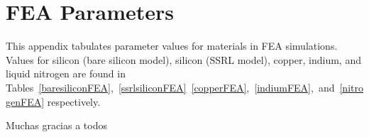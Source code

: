 \documentclass{iucr}
\begin{document}
\appendix

\section{FEA Parameters}\label{feaparameters}

This appendix tabulates parameter values for materials in FEA simulations. Values for silicon (bare silicon model), silicon (SSRL model), copper, indium, and liquid nitrogen are found in Tables~\ref{baresiliconFEA},~\ref{ssrlsiliconFEA}~\ref{copperFEA},~\ref{indiumFEA},~and~\ref{nitrogenFEA} respectively.
\vspace{1.5cm}







Muchas gracias a todos








\end{document}
